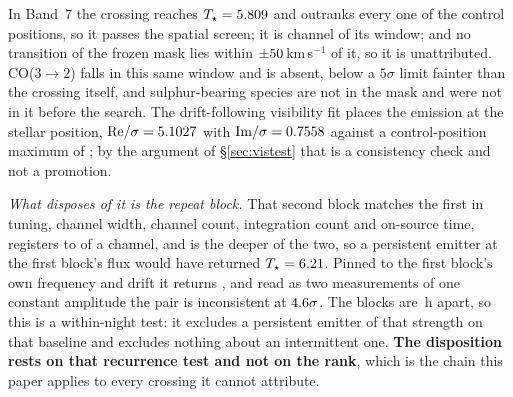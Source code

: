 In Band~7 the crossing reaches $T_\star=5.809{}$ and outranks every one of
the \NCtrl{} control positions, so it passes the spatial screen; it is
channel \VnCpChan{} of its window; and no transition of the frozen mask lies
within $\pm50$\,km\,s$^{-1}$ of it, so it is unattributed.
CO($3{\to}2$) falls in this same window and is absent, below a $5\sigma$
limit fainter than the crossing itself, and sulphur-bearing species are not
in the mask and were not in it before the search. The drift-following
visibility fit places the emission at the stellar position,
${\rm Re}/\sigma=5.1027$ with ${\rm Im}/\sigma=0.7558$
against a control-position maximum of \VnCpCtrlAdopted; by the argument of
\S\ref{sec:vistest} that is a consistency check and not a promotion.

\emph{What disposes of it is the repeat block.} That second block matches the
first in tuning, channel width, channel count, integration count and
on-source time, registers to \CpRecOffChan{} of a channel, and is the deeper
of the two, so a persistent emitter at the first block's flux would have
returned $T_\star=6.21$. Pinned to the first block's own frequency and
drift it returns \CpRecT, and read as two measurements of one constant
amplitude the pair is inconsistent at $4.6\sigma$. The blocks are
\CpSepH\,h apart, so this is a within-night test: it excludes a persistent
emitter of that strength on that baseline and excludes nothing about an
intermittent one. \textbf{The disposition rests on that recurrence test and
not on the rank}, which is the chain this paper applies to every crossing it
cannot attribute.

